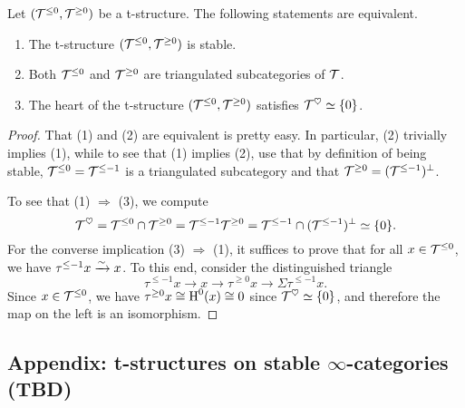 \begin{proposition}
	Let \((\mathcal{T}^{\leq 0},\mathcal{T}^{\geq 0})\) be a t-structure. The following statements are equivalent.
	\begin{enumerate}[label=(\arabic*)]
		\item The t-structure \((\mathcal{T}^{\leq 0},\mathcal{T}^{\geq 0})\) is stable.
		\item Both \(\mathcal{T}^{\leq0}\) and \(\mathcal{T}^{\geq0}\) are triangulated subcategories of \(\mathcal{T}\).
		\item The heart of the t-structure \((\mathcal{T}^{\leq 0},\mathcal{T}^{\geq 0})\) satisfies \(\mathcal{T}^\heartsuit\simeq\{0\}\).
	\end{enumerate}
\end{proposition}
\begin{proof}
That (1) and (2) are equivalent is pretty easy. In particular, (2) trivially implies (1), while to see that (1) implies (2), use that by definition of being
stable, \(\mathcal{T}^{\leq 0} = \mathcal{T}^{\leq -1}\) is a triangulated subcategory and that \(\mathcal{T}^{\geq 0} = (\mathcal{T}^{\leq -1})^\perp\).

To see that (1) \(\Rightarrow\) (3), we compute
\[ \mathcal{T}^\heartsuit = \mathcal{T}^{\leq 0}\cap\mathcal{T}^{\geq0} = \mathcal{T}^{\leq -1}\mathcal{T}^{\geq 0} = \mathcal{T}^{\leq -1} \cap (\mathcal{T}^{\leq -1})^\perp \simeq \{0\}. \]
For the converse implication (3) \(\Rightarrow\) (1), it suffices to prove that for all \(x\in\mathcal{T}^{\leq 0}\), we have \(\tau^{\leq -1}x \xrightarrow{\sim} x\).
To this end, consider the distinguished triangle
\[ \tau^{\leq -1}x \to x \to \tau^{\geq 0}x \to \Sigma\tau^{\leq -1}x. \]
Since \(x\in\mathcal{T}^{\leq 0}\), we have \(\tau^{\geq 0}x \cong \operatorname{H}^0(x)\cong 0\) since \(\mathcal{T}^\heartsuit\simeq\{0\}\), and therefore
the map on the left is an isomorphism.
\end{proof}

\subsection{Appendix: t-structures on stable \(\infty\)-categories (TBD)}

